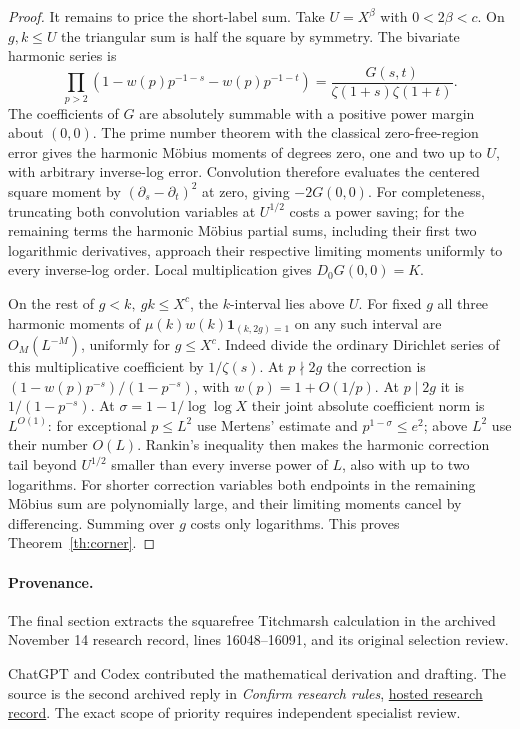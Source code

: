 \documentclass[11pt]{article}
\begin{document}
\begin{proof}
It remains to price the short-label sum. Take \(U=X^\beta\) with
\(0<2\beta<c\). On \(g,k\le U\) the triangular sum is half the square
by symmetry. The bivariate harmonic series is
\[
 \prod_{p>2}(1-w(p)p^{-1-s}-w(p)p^{-1-t})
   =\frac{G(s,t)}{\zeta(1+s)\zeta(1+t)}.
\]
The coefficients of \(G\) are absolutely summable with a positive power
margin about \((0,0)\). The prime number theorem with the classical
zero-free-region error gives the harmonic M\"obius moments of degrees zero,
one and two up to \(U\), with arbitrary inverse-log error. Convolution
therefore evaluates the centered square moment by
\((\partial_s-\partial_t)^2\) at zero, giving \(-2G(0,0)\).
For completeness, truncating both convolution variables at \(U^{1/2}\)
costs a power saving; for the remaining terms the harmonic M\"obius
partial sums, including their first two logarithmic derivatives, approach
their respective limiting moments uniformly to every inverse-log order.
Local multiplication gives \(D_0G(0,0)=K\).

On the rest of \(g<k,\ gk\le X^c\), the \(k\)-interval lies above \(U\).
For fixed \(g\) all three harmonic moments of \(\mu(k)w(k)\mathbf1_{(k,2g)=1}\)
on any such interval are \(O_M(L^{-M})\), uniformly for \(g\le X^c\).
Indeed divide the ordinary Dirichlet series of this multiplicative
coefficient by \(1/\zeta(s)\). At \(p\nmid2g\) the correction is
\((1-w(p)p^{-s})/(1-p^{-s})\), with \(w(p)=1+O(1/p)\).
At \(p\mid2g\) it is \(1/(1-p^{-s})\).
At \(\sigma=1-1/\log\log X\) their joint absolute coefficient norm
is \(L^{O(1)}\): for exceptional \(p\le L^2\) use Mertens' estimate and
\(p^{1-\sigma}\le e^2\); above \(L^2\) use their number \(O(L)\).
Rankin's inequality then makes the harmonic correction tail beyond \(U^{1/2}\)
smaller than every inverse power of \(L\), also with up to two logarithms.
For shorter correction variables both endpoints in the remaining M\"obius
sum are polynomially large, and their limiting moments cancel by
differencing. Summing over \(g\) costs only logarithms. This proves
Theorem~\ref{th:corner}.
\end{proof}

\paragraph{Provenance.}
The final section extracts the squarefree Titchmarsh calculation in the archived November 14 research record, lines 16048--16091, and its original selection review.

ChatGPT and Codex contributed the mathematical derivation and drafting.
The source is the second archived reply in \emph{Confirm research
rules}, \href{https://github.com/cosmosgeek0/Twin-Prime/blob/main/history/hosted-research-responses-2026-11-25.md}{hosted research record}.
The exact scope of priority requires independent specialist review.
\end{document}
